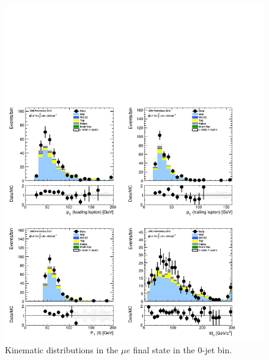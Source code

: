 \begin{figure}[!hbtp]
\centering
\includegraphics[width=1\textwidth]{figures/ww_analysis20_0_ALL_me_0j.pdf}
\caption{Kinematic distributions in the $\mu e$ final state in the 0-jet bin.}
\label{fig:xs_kinematics_me_0j}
\end{figure}
